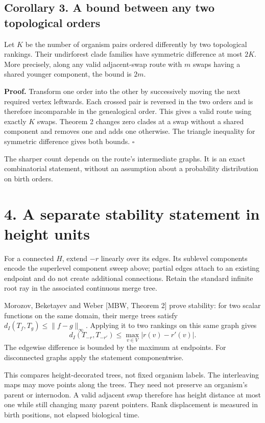 \documentclass[
  11pt,
  letterpaper,
]{article}
\begin{document}
\subsection{Corollary 3. A bound between any two topological
orders}\label{corollary-3.-a-bound-between-any-two-topological-orders}

Let \(K\) be the number of organism pairs ordered differently by two
topological rankings. Their undirforest clade families have symmetric
difference at most \(2K\). More precisely, along any valid adjacent-swap
route with \(m\) swaps having a shared younger component, the bound is
\(2m\).

\textbf{Proof.} Transform one order into the other by successively
moving the next required vertex leftwards. Each crossed pair is reversed
in the two orders and is therefore incomparable in the genealogical
order. This gives a valid route using exactly \(K\) swaps. Theorem 2
changes zero clades at a swap without a shared component and removes one
and adds one otherwise. The triangle inequality for symmetric difference
gives both bounds. \hfill\(\square\)

The sharper count depends on the route's intermediate graphs. It is an
exact combinatorial statement, without an assumption about a probability
distribution on birth orders.

\section{4. A separate stability statement in height
units}\label{a-separate-stability-statement-in-height-units}

For a connected \(H\), extend \(-r\) linearly over its edges. Its
sublevel components encode the superlevel component sweep above; partial
edges attach to an existing endpoint and do not create additional
connections. Retain the standard infinite root ray in the associated
continuous merge tree.

Morozov, Beketayev and Weber {[}MBW, Theorem 2{]} prove stability: for
two scalar functions on the same domain, their merge trees satisfy
\(d_I(T_f,T_g)\leq\|f-g\|_\infty\). Applying it to two rankings on this
same graph gives \[
                       d_I(T_{-r},T_{-r'})
                              \leq\max_{v\in V}|r(v)-r'(v)|.
\] The edgewise difference is bounded by the maximum at endpoints. For
disconnected graphs apply the statement componentwise.

This compares height-decorated trees, not fixed organism labels. The
interleaving maps may move points along the trees. They need not
preserve an organism's parent or internodon. A valid adjacent swap
therefore has height distance at most one while still changing many
parent pointers. Rank displacement is measured in birth positions, not
elapsed biological time.
\end{document}
